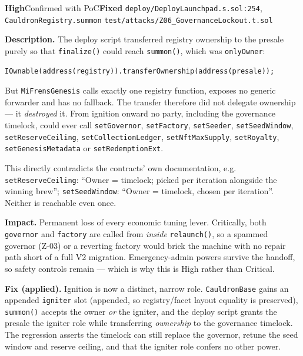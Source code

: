 \documentclass[10pt,a4paper]{article}
\newcommand{\sev}[2]{\textcolor{#1}{\textbf{#2}}}
\newcommand{\SevHigh}{\sev{high}{High}}
\newcommand{\Fixed}{\textcolor{ok}{\textbf{Fixed}}}
\newcommand{\code}[1]{\texttt{\small #1}}
\begin{document}
{\SevHigh}{Confirmed with PoC}{\Fixed}
{\code{deploy/DeployLaunchpad.s.sol:254}, \code{CauldronRegistry.summon}}
{\code{test/attacks/Z06\_GovernanceLockout.t.sol}}

\textbf{Description.} The deploy script transferred registry ownership to the presale
purely so that \code{finalize()} could reach \code{summon()}, which was \code{onlyOwner}:

\begin{lstlisting}
IOwnable(address(registry)).transferOwnership(address(presale));
\end{lstlisting}

But \code{MiFrensGenesis} calls exactly one registry function, exposes no generic
forwarder and has no fallback. The transfer therefore did not delegate ownership --- it
\emph{destroyed} it. From ignition onward no party, including the governance timelock,
could ever call \code{setGovernor}, \code{setFactory}, \code{setSeeder},
\code{setSeedWindow}, \code{setReserveCeiling}, \code{setCollectionLedger},
\code{setNftMaxSupply}, \code{setRoyalty}, \code{setGenesisMetadata} or
\code{setRedemptionExt}.

This directly contradicts the contracts' own documentation, e.g.
\code{setReserveCeiling}: ``Owner = timelock; picked per iteration alongside the winning
brew''; \code{setSeedWindow}: ``Owner = timelock, chosen per iteration''. Neither is
reachable even once.

\textbf{Impact.} Permanent loss of every economic tuning lever. Critically, both
\code{governor} and \code{factory} are called from \emph{inside} \code{relaunch()}, so a
spammed governor (Z-03) or a reverting factory would brick the machine with no repair
path short of a full V2 migration. Emergency-admin powers survive the handoff, so safety
controls remain --- which is why this is High rather than Critical.

\textbf{Fix (applied).} Ignition is now a distinct, narrow role. \code{CauldronBase} gains
an appended \code{igniter} slot (appended, so registry/facet layout equality is
preserved), \code{summon()} accepts the owner \emph{or} the igniter, and the deploy script
grants the presale the igniter role while transferring \emph{ownership} to the governance
timelock. The regression asserts the timelock can still replace the governor, retune the
seed window and reserve ceiling, and that the igniter role confers no other power.
\end{document}

